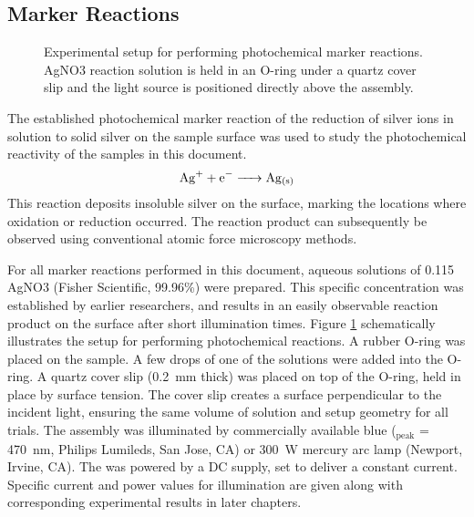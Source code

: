 \documentclass[12pt,%
              twoside,
               letterpaper]{uiothesis}
\begin{document}
\subsection{Marker Reactions}
\label{subsec:exp.markerreactions}

\begin{figure}
\begin{center}
\caption[Experimental setup for marker reactions]{%
	Experimental setup for performing photochemical marker 
	reactions. AgNO3 reaction solution is held in an 
	O-ring under a quartz cover slip and the light source 
	is positioned directly above the assembly.}
\label{fig:rxnsetup}
\end{center}
\end{figure}
The established photochemical marker reaction of the reduction of silver ions in solution
to solid silver on the sample surface was used to study the photochemical reactivity of
the samples in this document.
\begin{equation}
\ce{Ag+ + e- -> Ag_{(s)}}
\end{equation}
This reaction deposits insoluble silver on the surface, marking the locations where
oxidation or reduction
occurred.\cite{Giocondi:2001gz,Burbure:2010go,Giocondi:2001bi,Burbure:2010ti,Bhardwaj:2010eh,%
Giocondi:2008ja,Lowekamp:1998ks,MorrisHotsenpiller:1998jq} The reaction product can
subsequently be observed using conventional atomic force microscopy methods.

For all marker reactions performed in this document, aqueous solutions of 0.115~\Molar
AgNO3 (Fisher Scientific, 99.96\%) were prepared. This specific concentration was
established by earlier
researchers,\cite{Giocondi:2001gz,Burbure:2010go,Giocondi:2001bi,Burbure:2010ti,Bhardwaj:2010eh,%
Giocondi:2008ja,Lowekamp:1998ks,MorrisHotsenpiller:1998jq} and results in an easily
observable reaction product on the surface after short illumination times.  Figure
\ref{fig:rxnsetup} schematically illustrates the setup for performing photochemical
reactions. A rubber O-ring was placed on the sample. A few drops of one of the solutions
were added into the O-ring. A quartz cover slip (\SI{0.2}{\milli\meter} thick) was placed
on top of the O-ring, held in place by surface tension. The cover slip creates a surface
perpendicular to the incident light, ensuring the same volume of solution and setup
geometry for all trials. The assembly was illuminated by commercially available blue
 (\textlambda{}$_{\text{peak}}$ = \SI{470}{\nano\meter}, Philips Lumileds, San
Jose, CA) or \SI{300}{\watt} mercury arc lamp (Newport, Irvine, CA). The  was
powered by a DC supply, set to deliver a constant current. Specific current and power
values for illumination are given along with corresponding experimental results in later
chapters. 
\end{document}
